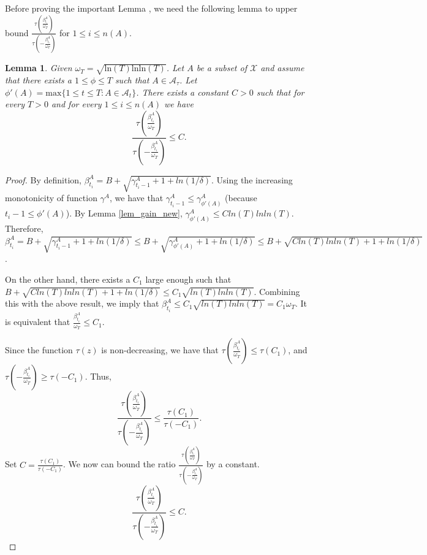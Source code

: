 \documentclass[twoside]{article}
\newtheorem{lemma}{Lemma}
\begin{document}
Before proving the important Lemma \label{lem3.5},  we need the following lemma to upper bound $\frac{\tau(\frac{\beta^{A}_{t_i}}{\omega_T})}{ \tau(-\frac{\beta^{A}_{t_i}}{\omega_T})}$ for $1 \le i \le n(A)$.
\begin{lemma}
Given $\omega_T = \sqrt{\text{ln}(T)\text{ln} \text{ln}(T)}$. Let $A$ be a subset of $\mathcal X$ and assume that there exists a $1 \le \phi \le T$ such that $A \in \mathcal A_{\tau}$. Let $\phi'(A) = \text{max}\{1 \le t \le T: A \in \mathcal A_t\}$. There exists a constant $C > 0$ such that for every $T > 0$ and for every $1 \le i \le n(A)$ we have
$$\frac{\tau(\frac{\beta^A_{t_i}}{\omega_T})}{ \tau(-\frac{\beta^A_{t_i}}{\omega_T})} \le C.$$
\end{lemma}
\begin{proof}
By definition, $\beta^A_{t_i} = B + \sqrt{\gamma^A_{t_i -1} + 1 + ln(1/\delta)}$. Using the increasing monotonicity of function $\gamma^A$, we have that $\gamma^A_{t_i -1} \le \gamma_{\phi'(A)}^A$ (because $t_i-1 \le \phi'(A)$). By Lemma \ref{lem_gain_new}, $\gamma_{\phi'(A)}^A \le Cln(T)lnln(T)$. Therefore, $\beta^A_{t_i} = B + \sqrt{\gamma^A_{t_i -1} + 1 + ln(1/\delta)} \le B + \sqrt{\gamma_{\phi'(A)}^A + 1 + ln(1/\delta)} \le B + \sqrt{Cln(T)lnln(T) + 1 + ln(1/\delta)}$.

On the other hand, there exists a $C_1$ large enough such that $B + \sqrt{Cln(T)lnln(T) + 1 + ln(1/\delta)} \le C_1\sqrt{ln(T)lnln(T)}$. Combining this with the above result, we imply that $\beta^A_{t_i} \le C_1\sqrt{ln(T)lnln(T)} = C_1\omega_T$. It is equivalent that $\frac{\beta^A_{t_i}}{\omega_T} \le C_1$.

Since the function $\tau(z)$ is non-decreasing, we have that $\tau(\frac{\beta^A_{t_i}}{\omega_T}) \le \tau ( C_1)$, and $\tau(-\frac{\beta^A_{t_i}}{\omega_T}) \ge \tau (- C_1)$. Thus,
$$\frac{\tau(\frac{\beta^A_{t_i}}{\omega_T})}{ \tau(-\frac{\beta^A_{t_i}}{\omega_T})} \le \frac{\tau( C_1)}{\tau(- C_1)}.$$
Set $C = \frac{\tau( C_1)}{\tau(- C_1)}$. We now can bound the ratio $\frac{\tau(\frac{\beta^A_{t_i}}{\omega_T})}{ \tau(-\frac{\beta^A_{t_i}}{\omega_T})}$ by a constant.
$$\frac{\tau(\frac{\beta^A_{t_i}}{\omega_T})}{ \tau(-\frac{\beta^A_{t_i}}{\omega_T})} \le C.$$
\end{proof}
\end{document}
